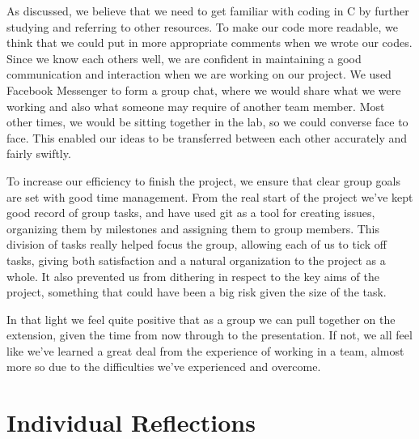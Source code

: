 \documentclass[11pt]{article}
\begin{document}
As discussed, we believe that we need to get familiar with coding in C by
further studying and referring to other resources. To make our code more
readable, we think that we could put in more appropriate comments when we
wrote our codes. Since we know each others well, we are confident in
maintaining a good communication and interaction when we are working on
our project. We used Facebook Messenger to form a group chat, where we
would share what we were working and also what someone may require of another
team member. Most other times, we would be sitting together in the lab, so we
could converse face to face. This enabled our ideas to be transferred between
each other accurately and fairly swiftly.

To increase our efficiency to finish the project, we ensure that clear group
 goals are set with good time management. From the real start of the project
 we've kept good record of group tasks, and have used git as a tool for
  creating issues, organizing them by milestones and assigning them to group
   members. This division of tasks really helped focus the group, allowing
   each of us to tick off tasks, giving both satisfaction and a natural
   organization to the project as a whole. It also prevented us from dithering
   in respect to the key aims of the project, something that could have been a
   big risk given the size of the task.

In that light we feel quite positive that as a group we can pull together on
the extension, given the time from now through to the presentation. If not,
 we all feel like we've learned a great deal from the experience of working in
 a team, almost more so due to the difficulties we've experienced and overcome.


\section{Individual Reflections}
\end{document}
